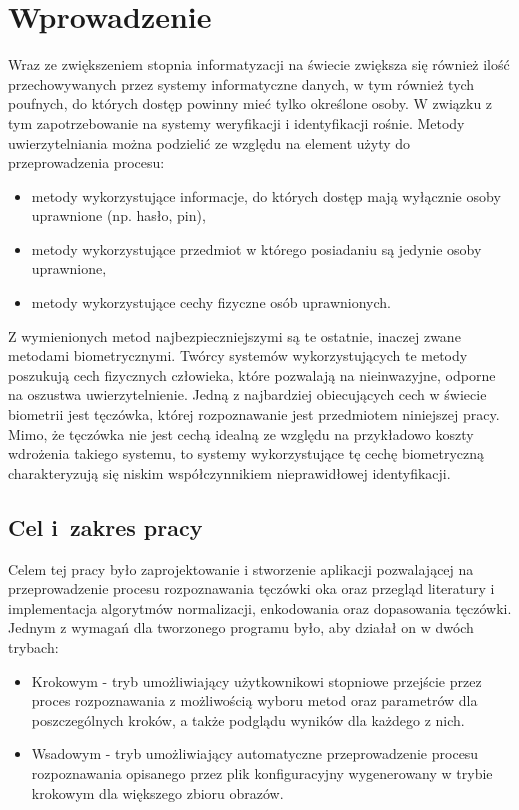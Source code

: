 \chapter{Wprowadzenie}


Wraz ze zwiększeniem stopnia informatyzacji na świecie zwiększa się również iloś\'c przechowywanych przez
systemy informatyczne danych, w tym również tych poufnych, do których dostęp powinny mie\'c tylko
określone osoby. W związku z tym zapotrzebowanie na systemy weryfikacji i identyfikacji rośnie. Metody
uwierzytelniania można podzieli\'c ze względu na element użyty do przeprowadzenia procesu:

\begin{itemize}
  \item metody wykorzystujące informacje, do których dostęp mają wyłącznie osoby uprawnione (np. hasło, pin),
  \item metody wykorzystujące przedmiot w którego posiadaniu są jedynie osoby uprawnione,
  \item metody wykorzystujące cechy fizyczne osób uprawnionych.
\end{itemize}

Z wymienionych metod najbezpieczniejszymi są te ostatnie, inaczej zwane metodami biometrycznymi.
Twórcy systemów wykorzystujących te metody poszukują cech fizycznych człowieka, które pozwalają na
nieinwazyjne, odporne na oszustwa uwierzytelnienie. Jedną z najbardziej obiecujących cech
w świecie biometrii jest tęczówka, której rozpoznawanie jest przedmiotem niniejszej pracy. Mimo, że
tęczówka nie jest cechą idealną ze względu na przykładowo koszty wdrożenia takiego systemu,
to systemy wykorzystujące tę cechę biometryczną charakteryzują się niskim współczynnikiem nieprawidłowej
identyfikacji.

\section{Cel i~zakres pracy}

Celem tej pracy było zaprojektowanie i stworzenie aplikacji pozwalającej na przeprowadzenie procesu
rozpoznawania tęczówki oka oraz przegląd literatury i implementacja algorytmów normalizacji,
enkodowania oraz dopasowania tęczówki. Jednym z wymagań dla tworzonego programu było, aby działał
on w dwóch trybach:

\begin{itemize}
    \item Krokowym - tryb umożliwiający użytkownikowi stopniowe przejście przez proces rozpoznawania
    z możliwością wyboru metod oraz parametrów dla poszczególnych kroków, a także podglądu wyników dla
    każdego z nich.

    \item Wsadowym - tryb umożliwiający automatyczne przeprowadzenie procesu rozpoznawania opisanego przez
    plik konfiguracyjny wygenerowany w trybie krokowym dla większego zbioru obrazów.
\end{itemize}

